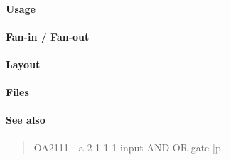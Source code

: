 \paragraph{Usage}

\paragraph{Fan-in / Fan-out}

\paragraph{Layout}

\paragraph{Files}

\paragraph{See also}
\begin{quote}
    OA2111 - a 2-1-1-1-input AND-OR gate [p.\pageref{OA2111}]
\end{quote}
